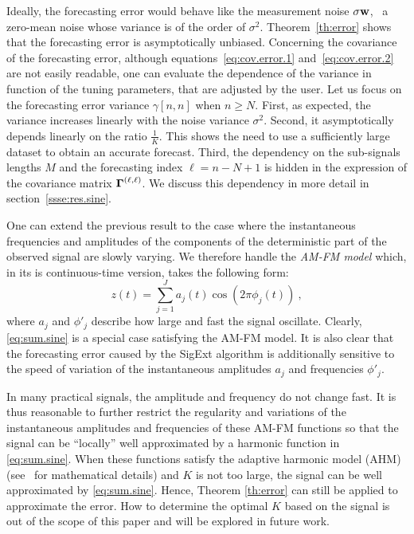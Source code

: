 Ideally, the forecasting error would behave like the measurement noise $\sigma{\mathbf w}$, \ie~a zero-mean noise whose variance is of the order of $\sigma^2$. Theorem~\ref{th:error} shows that the forecasting error is asymptotically unbiased. Concerning the covariance of the forecasting error, although equations~\eqref{eq:cov.error.1} and~\eqref{eq:cov.error.2} are not easily readable, one can evaluate the dependence of the variance in function of the tuning parameters, that are adjusted by the user. Let us focus on the forecasting error variance $\gamma[n,n]$ when $n\geq N$. First, as expected, the variance increases linearly with the noise variance $\sigma^2$. Second, it asymptotically depends linearly on the ratio $\frac{1}{K}$. This shows the need to use a sufficiently large dataset to obtain an accurate forecast. Third, the dependency on the sub-signals lengths $M$ and the forecasting index $\ell=n-N+1$ is hidden in the expression of the covariance matrix $\boldsymbol{\Gamma}^{(\ell,\ell)}$. We discuss this dependency in more detail in section~\ref{ssse:res.sine}.

\begin{remark}\label{RemarkAHM}
One can extend the previous result to the case where the instantaneous frequencies and amplitudes of the components of the deterministic part of the observed signal are slowly varying. We therefore handle the \textit{AM-FM model} which, in its is continuous-time version, takes the following form:
\begin{equation}
z(t) = \sum_{j=1}^J a_j(t)\cos(2\pi\phi_j(t))\ ,
\end{equation}
where $a_j$ and $\phi'_j$ describe how large and fast the signal oscillate. 
Clearly, \eqref{eq:sum.sine} is a special case satisfying the AM-FM model. It is also clear that the forecasting error caused by the {\sf SigExt} algorithm is additionally sensitive to the speed of variation of the instantaneous amplitudes $a_j$ and frequencies $\phi'_j$. 
%

In many practical signals, the amplitude and frequency do not change fast. It is thus reasonable to further restrict the regularity and variations of the instantaneous amplitudes and frequencies of these AM-FM functions so that the signal can be ``locally'' well approximated by a harmonic function in \eqref{eq:sum.sine}. When these functions satisfy the adaptive harmonic model (AHM) (see~\cite{Chen14nonparametric,Daubechies16conceft} for mathematical details) and $K$ is not too large, the signal can be well approximated by \eqref{eq:sum.sine}. Hence, Theorem \ref{th:error} can still be applied to approximate the error. How to determine the optimal $K$ based on the signal is out of the scope of this paper and will be explored in future work.
\end{remark}



